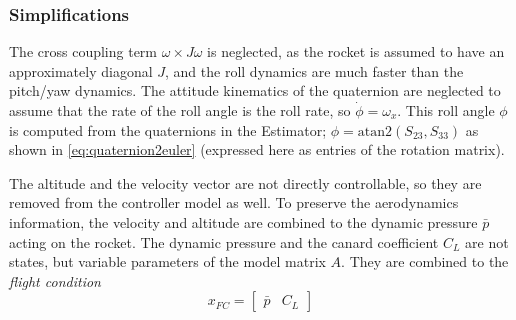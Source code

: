 \subsubsection{Simplifications}
The cross coupling term $\omega \times J \omega$ is neglected, as the rocket is assumed to have an approximately diagonal $J$, and the roll dynamics are much faster than the pitch/yaw dynamics. 
The attitude kinematics of the quaternion are neglected to assume that the rate of the roll angle is the roll rate, so $\dot \phi = \omega_x$.
This roll angle $\phi$ is computed from the quaternions in the Estimator; $\phi = \mathrm{atan2}( S_{23}, S_{33} )$ as shown in \autoref{eq:quaternion2euler} (expressed here as entries of the rotation matrix).

The altitude and the velocity vector are not directly controllable, so they are removed from the controller model as well. 
To preserve the aerodynamics information, the velocity and altitude are combined to the dynamic pressure $\bar p$ acting on the rocket. 
The dynamic pressure and the canard coefficient $C_L$ are not states, but variable parameters of the model matrix $A$.
They are combined to the \emph{flight condition}
\begin{equation}
    x_{FC} = \begin{bmatrix} \bar p & C_L \end{bmatrix} \label{eq:controller-model-fc}
\end{equation}

